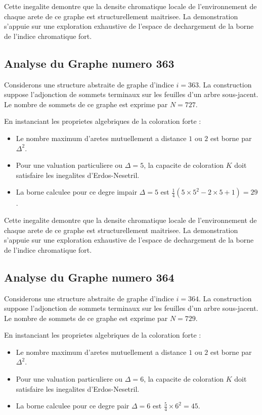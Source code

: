 \documentclass[11pt,a4paper]{article}
\begin{document}
Cette inegalite demontre que la densite chromatique locale de l'environnement de chaque arete de ce graphe est structurellement maitrisee. La demonstration s'appuie sur une exploration exhaustive de l'espace de dechargement de la borne de l'indice chromatique fort.

\subsection{Analyse du Graphe numero 363}
Considerons une structure abstraite de graphe d'indice $i = 363$. La construction suppose l'adjonction de sommets terminaux sur les feuilles d'un arbre sous-jacent. Le nombre de sommets de ce graphe est exprime par $N = 727$.

En instanciant les proprietes algebriques de la coloration forte :
\begin{itemize}
\item Le nombre maximum d'aretes mutuellement a distance $1$ ou $2$ est borne par $\Delta^2$.
\item Pour une valuation particuliere ou $\Delta = 5$, la capacite de coloration $K$ doit satisfaire les inegalites d'Erdos-Nesetril.
\item La borne calculee pour ce degre impair $\Delta = 5$ est $\frac{1}{4}(5 \times 5^2 - 2 \times 5 + 1) = 29$.
\end{itemize}

Cette inegalite demontre que la densite chromatique locale de l'environnement de chaque arete de ce graphe est structurellement maitrisee. La demonstration s'appuie sur une exploration exhaustive de l'espace de dechargement de la borne de l'indice chromatique fort.

\subsection{Analyse du Graphe numero 364}
Considerons une structure abstraite de graphe d'indice $i = 364$. La construction suppose l'adjonction de sommets terminaux sur les feuilles d'un arbre sous-jacent. Le nombre de sommets de ce graphe est exprime par $N = 729$.

En instanciant les proprietes algebriques de la coloration forte :
\begin{itemize}
\item Le nombre maximum d'aretes mutuellement a distance $1$ ou $2$ est borne par $\Delta^2$.
\item Pour une valuation particuliere ou $\Delta = 6$, la capacite de coloration $K$ doit satisfaire les inegalites d'Erdos-Nesetril.
\item La borne calculee pour ce degre pair $\Delta = 6$ est $\frac{5}{4} \times 6^2 = 45$.
\end{itemize}
\end{document}
